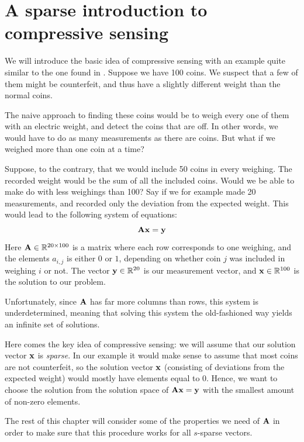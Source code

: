 \chapter{A sparse introduction to compressive sensing}
\label{sec:basic_cs}

We will introduce the basic idea of compressive sensing with an example quite similar to the one found in \cite{bryan13makingdo}. Suppose we have 100 coins. We suspect that a few of them might be counterfeit, and thus have a slightly different weight than the normal coins. 

The naive approach to finding these coins would be to weigh every one of them with an electric weight, and detect the coins that are off. In other words, we would have to do as many measurements as there are coins. But what if we weighed more than one coin at a time?

Suppose, to the contrary, that we would include 50 coins in every weighing. The recorded weight would be the sum of all the included coins. Would we be able to make do with less weighings than 100? Say if we for example made 20 measurements, and recorded only the deviation from the expected weight. This would lead to the following system of equations:
\[
	\mathbf{A}\mathbf{x} = \mathbf{y}
\]
Here $ \mathbf{A} \in \mathbb{R}^{20 \times 100} $ is a matrix where each row corresponds to one weighing, and the elements $ a_{i,j} $ is either $ 0 $ or $ 1 $, depending on whether coin $ j $ was included in weighing $ i $ or not. The vector $ \mathbf{y} \in \mathbb{R}^{20} $ is our measurement vector, and $ \mathbf{x} \in \mathbb{R}^{100} $ is the solution to our problem. 

Unfortunately, since $ \mathbf{A} $ has far more columns than rows, this system is underdetermined, meaning that solving this system the old-fashioned way yields an infinite set of solutions. 

Here comes the key idea of compressive sensing: we will assume that our solution vector $ \mathbf{x} $ is \textit{sparse}. In our example it would make sense to assume that most coins are not counterfeit, so the solution vector $ \mathbf{x} $ (consisting of deviations from the expected weight) would mostly have elements equal to $ 0 $. Hence, we want to choose the solution from the solution space of $ \mathbf{A}\mathbf{x} = \mathbf{y} $ with the smallest amount of non-zero elements.

The rest of this chapter will consider some of the properties we need of $ \mathbf{A} $ in order to make sure that this procedure works for all $ s $-sparse vectors. 







